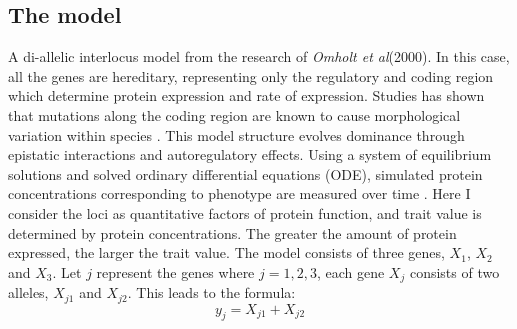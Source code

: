 \subsection{The model}
A di-allelic interlocus model from the research of \textit{Omholt et al}(2000). In this case, all the genes are hereditary, representing only the regulatory and coding region which determine protein expression and rate of expression. Studies has shown that mutations along the coding region are known to cause morphological variation within species \cite{stern2009genetic}. This model structure evolves dominance through epistatic interactions and autoregulatory effects. Using a system of equilibrium solutions and solved ordinary differential equations (ODE), simulated protein concentrations corresponding to phenotype are measured over time \cite{omholt2000gene}. Here I consider the loci as quantitative factors of protein function, and trait value is determined by protein concentrations. The greater the amount of protein expressed, the larger the trait value. The model consists of three genes, $X_1$, $X_2$ and $X_3$. Let \(j\) represent the genes where $j = {1,2,3}$, each gene $X_j$ consists of two alleles, $X_{j1}$ and $X_{j2}$. This leads to the formula:
\begin{equation*}
    y_j = X_{j1}  + X_{j2} \label{eq:Protein Expression} \tag{1}
\end{equation*}

